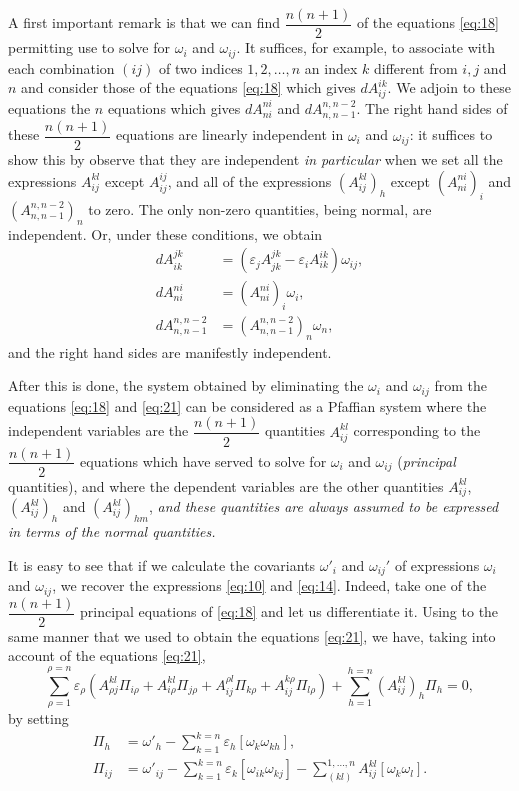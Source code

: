 \documentclass[leqno,12pt]{article}
\makeatletter
\let\old@epsilon\epsilon
\let\old@varepsilon\varepsilon
\let\epsilon\old@varepsilon
\let\varepsilon\old@epsilon
\theoremstyle{shape1}
\theoremstyle{shape0}
\theoremstyle{shape2}
\theoremstyle{definition}
\makeatother
\begin{document}
A first important remark is that we can find $\dfrac{n(n+1)}{2}$ of the equations \eqref{eq:18} permitting use to solve for $\omega_{i}$ and $\omega_{ij}$. It suffices, for example, to associate with each combination $(ij)$ of two indices $1,2,\dots,n$ an index $k$ different from $i,j$ and $n$ and consider those of the equations \eqref{eq:18} which gives $dA^{ik}_{ij}$. We adjoin to these equations the $n$ equations which gives $dA^{ni}_{ni}$ and $dA^{n,n-2}_{n,n-1}$. The right hand sides of these $\dfrac{n(n+1)}{2}$ equations are linearly independent in $\omega_{i}$ and $\omega_{ij}$: it suffices to show this by observe that they are independent \emph{in particular} when we set all the expressions $A^{kl}_{ij}$ except $A^{ij}_{ij}$, and all of the expressions $(A^{kl}_{ij})_{h}$ except $(A^{ni}_{ni})_{i}$ and $(A^{n,n-2}_{n,n-1})_{n}$ to zero. The only non-zero quantities, being normal, are independent. Or, under these conditions, we obtain
\begin{align*}
  dA^{jk}_{ik}&=(\epsilon_{j}A^{jk}_{jk}-\epsilon_{i}A^{ik}_{ik})\omega_{ij},\\
  dA^{ni}_{ni}&=(A^{ni}_{ni})_{i}\omega_{i},\\
  dA^{n,n-2}_{n,n-1}&=(A^{n,n-2}_{n,n-1})_{n}\omega_{n},
\end{align*}
and the right hand sides are manifestly independent.

After this is done, the system obtained by eliminating the $\omega_{i}$ and $\omega_{ij}$ from the equations \eqref{eq:18} and \eqref{eq:21} can be considered as a Pfaffian system where the independent variables are the $\dfrac{n(n+1)}{2}$ quantities $A^{kl}_{ij}$ corresponding to the $\dfrac{n(n+1)}{2}$ equations which have served to solve for $\omega_{i}$ and $\omega_{ij}$ (\emph{principal} quantities), and where the dependent variables are the other quantities $A^{kl}_{ij}$, $(A^{kl}_{ij})_{h}$ and $(A^{kl}_{ij})_{hm}$, \emph{and these quantities are always assumed to be expressed in terms of the normal quantities.}

It is easy to see that if we calculate the covariants $\omega'_{i}$ and $\omega_{ij}'$ of expressions $\omega_{i}$ and $\omega_{ij}$, we recover the expressions \eqref{eq:10} and \eqref{eq:14}. Indeed, take one of the $\dfrac{n(n+1)}{2}$ principal equations of \eqref{eq:18} and let us differentiate it. Using to the same manner that we used to obtain the equations \eqref{eq:21}, we have, taking into account of the equations \eqref{eq:21},
\[
\sum_{\rho=1}^{\rho=n}\epsilon_{\rho}(A^{kl}_{\rho j}\Pi_{i\rho}+A^{kl}_{i\rho}\Pi_{j\rho}+A^{\rho l}_{ij}\Pi_{k\rho}+A^{k\rho}_{ij}\Pi_{l\rho})+\sum_{h=1}^{h=n}(A^{kl}_{ij})_{h}\Pi_{h}=0,
\]
by setting
\begin{align*}
  \Pi_{h}&=\omega'_{h}-\sum_{k=1}^{k=n}\epsilon_{h}[\omega_{k}\omega_{kh}],\\
  \Pi_{ij}&=\omega'_{ij}-\sum_{k=1}^{k=n}\epsilon_{k}[\omega_{ik}\omega_{kj}]-\sum_{(kl)}^{1,\dots,n}A^{kl}_{ij}[\omega_{k}\omega_{l}].
\end{align*}
\end{document}
